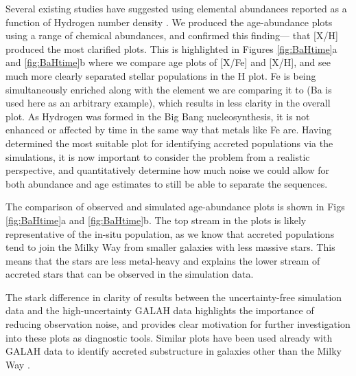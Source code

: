 \documentclass[fleqn,usenatbib]{mnras}
\begin{document}
Several existing studies have suggested using elemental abundances reported as a function of Hydrogen number density \citep{Fuhrmann2017,Feuillet2021}. We produced the age-abundance plots using a range of chemical abundances, and confirmed this finding— that [X/H] produced the most clarified plots. This is highlighted in Figures \ref{fig:BaHtime}a and \ref{fig:BaHtime}b where we compare age plots of [X/Fe] and [X/H], and see much more clearly separated stellar populations in the H plot. Fe is being simultaneously enriched along with the element we are comparing it to (Ba is used here as an arbitrary example), which results in less clarity in the overall plot. As Hydrogen was formed in the Big Bang nucleosynthesis, it is not enhanced or affected by time in the same way that metals like Fe are. Having determined the most suitable plot for identifying accreted populations via the simulations, it is now important to consider the problem from a realistic perspective, and quantitatively determine how much noise we could allow for both abundance and age estimates to still be able to separate the sequences.

The comparison of observed and simulated age-abundance plots is shown in Figs \ref{fig:BaHtime}a and \ref{fig:BaHtime}b. The top stream in the plots is likely representative of the in-situ population, as we know that accreted populations tend to join the Milky Way from smaller galaxies with less massive stars. This means that the stars are less metal-heavy and explains the lower stream of accreted stars that can be observed in the simulation data.

The stark difference in clarity of results between the uncertainty-free simulation data and the high-uncertainty GALAH data highlights the importance of reducing observation noise, and provides clear motivation for further investigation into these plots as diagnostic tools. Similar plots have been used already with GALAH data to identify accreted substructure in galaxies other than the Milky Way \citep{Martig2021}.
\end{document}
